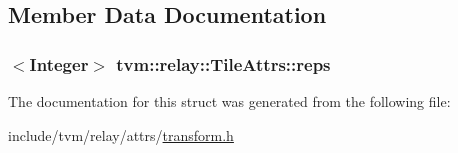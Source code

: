 \subsection{Member Data Documentation}
\subsubsection[{\texorpdfstring{reps}{reps}}]{$<${\bf Integer}$>$ tvm\+::relay\+::\+Tile\+Attrs\+::reps}\hypertarget{structtvm_1_1relay_1_1TileAttrs_acac0351f86c23beb264227981424022e}{}\label{structtvm_1_1relay_1_1TileAttrs_acac0351f86c23beb264227981424022e}


The documentation for this struct was generated from the following file\+:\begin{DoxyCompactItemize}
\item 
include/tvm/relay/attrs/\hyperlink{include_2tvm_2relay_2attrs_2transform_8h}{transform.\+h}\end{DoxyCompactItemize}
